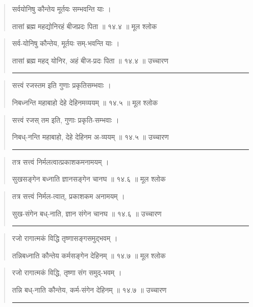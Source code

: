 \begin{quotation}

सर्वयोनिषु कौन्तेय मूर्तयः सम्भवन्ति याः  ।  

तासां ब्रह्म महद्योनिरहं बीजप्रदः पिता  ॥ १४.४ ॥  मूल श्लोक
\end{quotation}

\begin{quotation}

सर्व-योनिषु कौन्तेय, मूर्तयः सम्-भवन्ति याः  ।  

तासां ब्रह्म महद् योनिर, अहं बीज-प्रदः पिता  ॥ १४.४ ॥  उच्चारण

\noindent\rule{16cm}{0.4pt} 
\end{quotation}


\begin{quotation}

सत्त्वं रजस्तम इति गुणाः प्रकृतिसम्भवाः  ।  

निबध्नन्ति महाबाहो देहे देहिनमव्ययम्‌  ॥ १४.५ ॥  मूल श्लोक
\end{quotation}

\begin{quotation}

सत्त्वं रजस् तम इति, गुणाः प्रकृति-सम्भवाः  ।  

निबध्-नन्ति महाबाहो, देहे देहिनम अ-व्ययम्‌  ॥ १४.५ ॥  उच्चारण

\noindent\rule{16cm}{0.4pt} 
\end{quotation}


\begin{quotation}
तत्र सत्त्वं निर्मलत्वात्प्रकाशकमनामयम्‌  ।  

सुखसङ्‍गेन बध्नाति ज्ञानसङ्‍गेन चानघ  ॥ १४.६ ॥  मूल श्लोक
\end{quotation}

\begin{quotation}

तत्र सत्त्वं निर्मल-त्वात्, प्रकाशकम अनामयम्‌  ।  

सुख-संगेन बध्-नाति, ज्ञान संगेन चानघ  ॥ १४.६ ॥  उच्चारण

\noindent\rule{16cm}{0.4pt} 
\end{quotation}


\begin{quotation}

रजो रागात्मकं विद्धि तृष्णासङ्‍गसमुद्भवम्‌  ।  

तन्निबध्नाति कौन्तेय कर्मसङ्‍गेन देहिनम्‌  ॥ १४.७ ॥  मूल श्लोक
\end{quotation}

\begin{quotation}

रजो रागात्मकं विद्धि, तृष्णा संग समुद्-भवम्‌  ।  

तन्नि बध्-नाति कौन्तेय, कर्म-संगेन देहिनम्‌  ॥ १४.७ ॥  उच्चारण

\noindent\rule{16cm}{0.4pt} 
\end{quotation}


